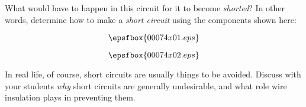 

What would have to happen in this circuit for it to become {\it shorted}?  In other words, determine how to make a {\it short circuit} using the components shown here:

$$\epsfbox{00074x01.eps}$$







$$\epsfbox{00074x02.eps}$$







In real life, of course, short circuits are usually things to be avoided.  Discuss with your students {\it why} short circuits are generally undesirable, and what role wire insulation plays in preventing them.




